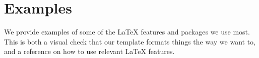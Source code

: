 \section{Examples}
We provide examples of some of the LaTeX features and packages we use most.
This is both a visual check that our template formats things the way we
want to, and a reference on how to use relevant LaTeX features.
